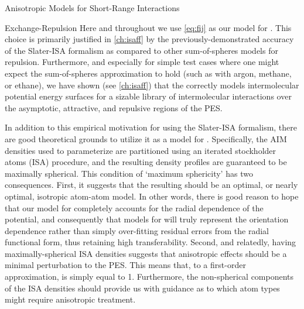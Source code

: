 \begin{subsection}{Anisotropic Models for Short-Range Interactions}
\begin{subsubsection}{Exchange-Repulsion}
Here and throughout we use \cref{eq:fij}
as our
model for \fij. This choice is primarily justified in \cref{ch:isaff} by the
previously-demonstrated accuracy of the Slater-ISA formalism as compared to other
sum-of-spheres models for repulsion.\cite{VanVleet2016} 
Furthermore, and especially for simple test cases where one
might expect the sum-of-spheres approximation to hold (such as with argon, methane, or ethane), we have shown (see
\cref{ch:isaff}) that the \isaffold
correctly models intermolecular potential energy surfaces for a sizable library of intermolecular
interactions over the asymptotic, attractive, and repulsive regions of
the PES.

In addition to this empirical motivation for using the Slater-ISA formalism,
there are good theoretical grounds to utilize it as a model for \fij.
Specifically, the AIM densities used to parameterize \isaffold are
partitioned using an iterated stockholder atoms (ISA) procedure,
and the resulting density profiles are guaranteed to be maximally spherical.
\cite{Misquitta2014,Lillestolen2008,Lillestolen2009}
This condition of `maximum sphericity' has two consequences. First, it
suggests that the resulting \isaffold should be an optimal, or nearly optimal,
isotropic atom-atom model. In other words, there is good reason to hope that
our model for \fij completely accounts for
the radial dependence of the potential, and consequently that models for \gij
will truly represent the orientation dependence rather than simply over-fitting
residual errors from the radial functional form, thus retaining high
transferability. 
Second, and relatedly,  having
maximally-spherical ISA densities suggests that anisotropic effects should be a
minimal perturbation to the PES. This means that, to a first-order
approximation, \gij is simply equal to 1. Furthermore, the non-spherical
components of the ISA densities should provide us
with guidance as to which atom types might require anisotropic treatment.


\end{subsubsection}
\end{subsection}
